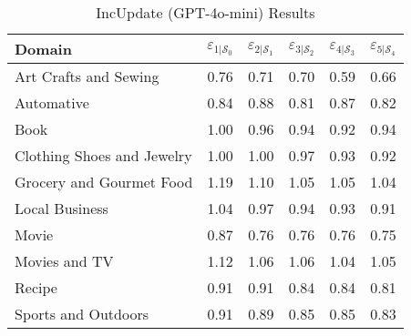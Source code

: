 \begin{table}[h]
    \centering
    \scriptsize
    \def\arraystretch{.99}
    \setlength{\tabcolsep}{0.42em}
    \begin{tabular}{lccccc}
      \toprule
      \textbf{Domain} & $\varepsilon_{1|\mathcal{S}_0}$ & $\varepsilon_{2|\mathcal{S}_1}$ & $\varepsilon_{3|\mathcal{S}_2}$ & $\varepsilon_{4|\mathcal{S}_3}$ & $\varepsilon_{5|\mathcal{S}_4}$ \\
      \midrule
      Art Crafts and Sewing     & 0.76 & 0.71 & 0.70 & 0.59 & 0.66 \\
      Automative                & 0.84 & 0.88 & 0.81 & 0.87 & 0.82 \\
      Book                      & 1.00 & 0.96 & 0.94 & 0.92 & 0.94 \\
      Clothing Shoes and Jewelry & 1.00 & 1.00 & 0.97 & 0.93 & 0.92 \\
      Grocery and Gourmet Food  & 1.19 & 1.10 & 1.05 & 1.05 & 1.04 \\
      Local Business            & 1.04 & 0.97 & 0.94 & 0.93 & 0.91 \\
      Movie                     & 0.87 & 0.76 & 0.76 & 0.76 & 0.75 \\
      Movies and TV             & 1.12 & 1.06 & 1.06 & 1.04 & 1.05 \\
      Recipe                    & 0.91 & 0.91 & 0.84 & 0.84 & 0.81 \\
      Sports and Outdoors       & 0.91 & 0.89 & 0.85 & 0.85 & 0.83 \\
      \bottomrule
    \end{tabular}
    \caption{IncUpdate (GPT-4o-mini) Results}
    \label{tab:incupdate_results}
   \end{table}
  
\newpage


